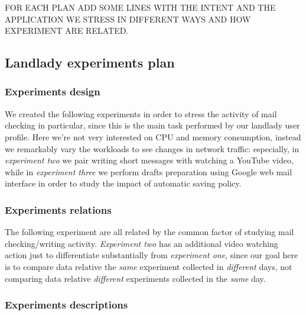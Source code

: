 \documentclass[10pt,a4paper]{article}
\begin{document}
    
    FOR EACH PLAN ADD SOME LINES WITH THE INTENT AND THE APPLICATION
    WE STRESS IN DIFFERENT WAYS AND HOW EXPERIMENT ARE RELATED.

    \subsection{Landlady experiments plan}

    \subsubsection*{Experiments design }
    We created the following experiments in order to stress the
    activity of mail checking in particular, since this is the main
    task performed by our landlady user profile. Here we're not very
    interested on CPU and memory consumption, instead we remarkably
    vary the workloads to see changes in network traffic: especially,
    in \emph{experiment two} we pair writing short messages with
    watching a YouTube video, while in \emph{experiment three} we
    perform drafts preparation using Google web mail interface in
    order to study the impact of automatic saving policy.

    \subsubsection*{Experiments relations}
    The following experiment are all related by the common factor of
    studying mail checking/writing activity. \emph{Experiment two} has
    an additional video watching action just to differentiate
    substantially from \emph{experiment one}, since our goal here is
    to compare data relative the \emph{same} experiment collected in
    \emph{different} days, not comparing data relative
    \emph{different} experiments collected in the \emph{same} day.

    \subsubsection*{Experiments descriptions}
    
\end{document}

